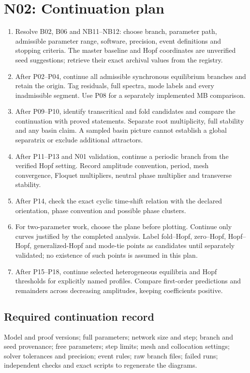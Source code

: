 \section{N02: Continuation plan}
\begin{enumerate}
\item Resolve B02, B06 and NB11--NB12: choose branch, parameter path,
admissible parameter range, software, precision, event definitions and stopping
criteria. The master baseline and Hopf coordinates are unverified seed
suggestions; retrieve their exact archival values from the registry.
\item After P02--P04, continue all admissible synchronous equilibrium branches
and retain the origin. Tag residuals, full spectra, mode labels and every
inadmissible segment. Use P08 for a separately implemented MB comparison.
\item After P09--P10, identify transcritical and fold candidates and compare
the continuation with proved statements. Separate root multiplicity, full
stability and any basin claim. A sampled basin picture cannot establish a
global separatrix or exclude additional attractors.
\item After P11--P13 and N01 validation, continue a periodic branch from the
verified Hopf setting. Record amplitude convention, period, mesh convergence,
Floquet multipliers, neutral phase multiplier and transverse stability.
\item After P14, check the exact cyclic time-shift relation with the declared
orientation, phase convention and possible phase clusters.
\item For two-parameter work, choose the plane before plotting. Continue only
curves justified by the completed analysis. Label fold--Hopf, zero--Hopf,
Hopf--Hopf, generalized-Hopf and mode-tie points as candidates until separately
validated; no existence of such points is assumed in this plan.
\item After P15--P18, continue selected heterogeneous equilibria and Hopf
thresholds for explicitly named profiles. Compare first-order predictions and
remainders across decreasing amplitudes, keeping coefficients positive.
\end{enumerate}
\subsection{Required continuation record}
Model and proof versions; full parameters; network size and step; branch and
seed provenance; free parameters; step limits; mesh and collocation settings;
solver tolerances and precision; event rules; raw branch files; failed runs;
independent checks and exact scripts to regenerate the diagrams.
